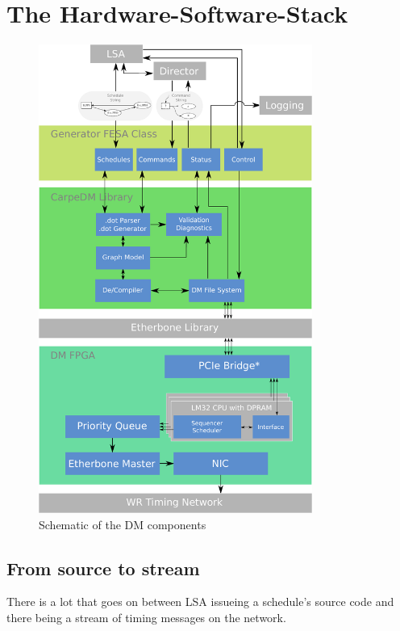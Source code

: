 \section{The Hardware-Software-Stack}
%
\begin{figure}[H]
   \centering
   \includegraphics*[width=0.8\textwidth,keepaspectratio]{Figures/stack}
   \caption{Schematic of the DM components}
   \label{fig:stack}
\end{figure}
%
\subsection{From source to stream}
There is a lot that goes on between LSA issueing a schedule's source code and there being a stream of timing messages on the network.
